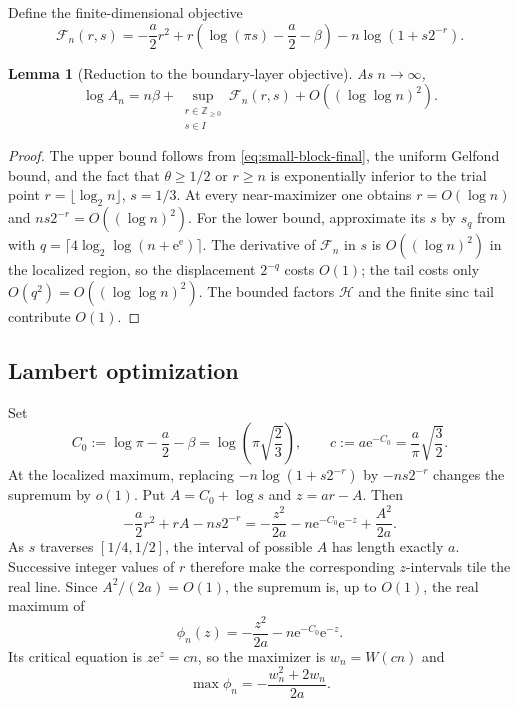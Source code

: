 \documentclass[11pt,oneside]{article}
\newtheorem{lemma}[lemma]{Lemma}
\theoremstyle{definition}
\theoremstyle{remark}
\newcommand{\Z}{\mathbb Z}
\newcommand{\e}{\mathrm e}
\begin{document}
Define the finite-dimensional objective
\begin{equation}
 \mathcal F_n(r,s)
 =-\frac a2r^2+r\left(\log(\pi s)-\frac a2-\beta\right)
 -n\log(1+s2^{-r}).
 \label{eq:Fn-final}
\end{equation}

\begin{lemma}[Reduction to the boundary-layer objective]
\label{lem:An-reduction-final}
As $n\to\infty$,
\begin{equation}
 \log A_n=n\beta+
 \sup_{\substack{r\in\Z_{\ge0}\\s\in I}}\mathcal F_n(r,s)
 +O((\log\log n)^2).
 \label{eq:An-reduction-final}
\end{equation}
\end{lemma}

\begin{proof}
The upper bound follows from \eqref{eq:small-block-final}, the uniform Gelfond bound, and the
fact that $\theta\ge1/2$ or $r\ge n$ is exponentially inferior to the trial point
$r=\lfloor\log_2n\rfloor$, $s=1/3$.  At every near-maximizer one obtains
$r=O(\log n)$ and $ns2^{-r}=O((\log n)^2)$.  For the lower bound, approximate its $s$ by
$s_q$ from  with
$q=\lceil4\log_2\log(n+\e^\e)\rceil$.  The derivative of $\mathcal F_n$ in $s$ is
$O((\log n)^2)$ in the localized region, so the displacement $2^{-q}$ costs $O(1)$; the
tail costs only $O(q^2)=O((\log\log n)^2)$.  The bounded factors
$\mathcal H$ and the finite sinc tail contribute $O(1)$.
\end{proof}

\subsection{Lambert optimization}

Set
\begin{equation}
 C_0:=\log\pi-\frac a2-\beta=\log\!\left(\pi\sqrt{\frac23}\right),
 \qquad
 c:=a\e^{-C_0}=\frac a\pi\sqrt{\frac32}.
 \label{eq:annular-c}
\end{equation}
At the localized maximum, replacing $-n\log(1+s2^{-r})$ by $-ns2^{-r}$ changes the
supremum by $o(1)$.  Put $A=C_0+\log s$ and $z=ar-A$.  Then
\begin{equation}
 -\frac a2r^2+rA-ns2^{-r}
 =-\frac{z^2}{2a}-n\e^{-C_0}\e^{-z}+\frac{A^2}{2a}.
 \label{eq:z-objective}
\end{equation}
As $s$ traverses $[1/4,1/2]$, the interval of possible $A$ has length exactly $a$.
Successive integer values of $r$ therefore make the corresponding $z$-intervals tile the
real line.  Since $A^2/(2a)=O(1)$, the supremum is, up to $O(1)$, the real maximum of
\[
 \phi_n(z)=-\frac{z^2}{2a}-n\e^{-C_0}\e^{-z}.
\]
Its critical equation is $z\e^z=cn$, so the maximizer is $w_n=W(cn)$ and
\begin{equation}
 \max\phi_n=-\frac{w_n^2+2w_n}{2a}.
 \label{eq:Lambert-value}
\end{equation}
\end{document}
